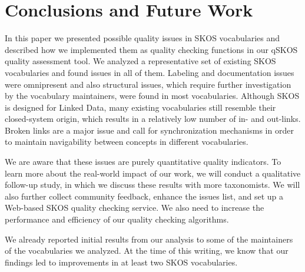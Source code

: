 \section{Conclusions and Future Work}\label{sec:conclusions}

In this paper we presented possible quality issues in SKOS vocabularies and described how we implemented them as quality checking functions in our qSKOS quality assessment tool. We analyzed a representative set of existing SKOS vocabularies and found  issues in all of them. Labeling and documentation issues were omnipresent and also structural issues, which require further investigation by the vocabulary maintainers, were found in most vocabularies. Although SKOS is designed for Linked Data, many existing vocabularies still resemble their closed-system origin, which results in a relatively low number of in- and out-links. Broken links are a major issue and call for synchronization mechanisms in order to maintain navigability between concepts in different vocabularies.

We are aware that these issues are purely quantitative quality indicators. To learn more about the real-world impact of our work, we will conduct a qualitative follow-up study, in which we discuss these results with more taxonomists. We will also further collect community feedback, enhance the issues list, and set up a Web-based SKOS quality checking service. We also need to increase the performance and efficiency of our quality checking algorithms.

We already reported initial results from our analysis to some of the maintainers of the vocabularies we analyzed. At the time of this writing, we know that our findings led to improvements in at least two SKOS vocabularies.

